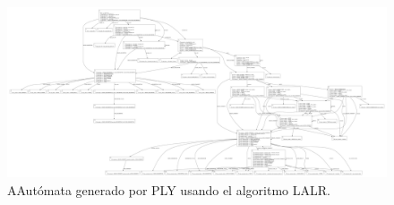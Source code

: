 \begin{figure}
    \centering
    \includegraphics[scale=0.13]{images/automata.pdf}
    \caption{AAutómata generado por PLY usando el algoritmo LALR.}
\end{figure}
